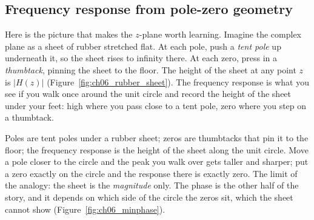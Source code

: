 \subsection{Frequency response from pole-zero geometry}

Here is the picture that makes the $z$-plane worth learning. Imagine the complex plane as a sheet
of rubber stretched flat. At each pole, push a \emph{tent pole} up underneath it, so the sheet
rises to infinity there. At each zero, press in a \emph{thumbtack}, pinning the sheet to the floor.
The height of the sheet at any point $z$ is $|H(z)|$ (Figure~\ref{fig:ch06_rubber_sheet}). The
frequency response is what you see if you walk once around the unit circle and record the height
of the sheet under your feet: high where you pass close to a tent pole, zero where you step on a
thumbtack.


\begin{analogy}
Poles are tent poles under a rubber sheet; zeros are thumbtacks that pin it to the floor; the
frequency response is the height of the sheet along the unit circle. Move a pole closer to the
circle and the peak you walk over gets taller and sharper; put a zero exactly on the circle and the
response there is exactly zero. The limit of the analogy: the sheet is the \emph{magnitude} only.
The phase is the other half of the story, and it depends on which side of the circle the zeros
sit, which the sheet cannot show (Figure~\ref{fig:ch06_minphase}).
\end{analogy}

